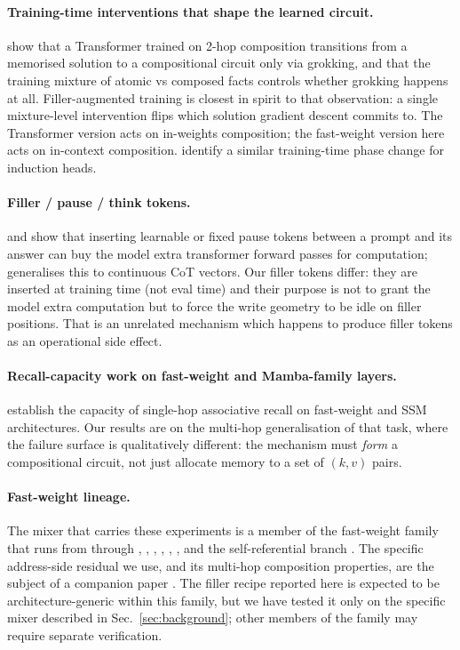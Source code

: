 \documentclass[11pt]{article}
\begin{document}
\paragraph{Training-time interventions that shape the learned
circuit.} \citet{wang2024grokked} show that a Transformer trained on
2-hop composition transitions from a memorised solution to a
compositional circuit only via grokking, and that the training
mixture of atomic vs composed facts controls whether grokking
happens at all. Filler-augmented training is closest in spirit to
that observation: a single mixture-level intervention flips which
solution gradient descent commits to. The Transformer version acts
on in-weights composition; the fast-weight version here acts on
in-context composition. \citet{olsson2022inductionheads} identify a
similar training-time phase change for induction heads.

\paragraph{Filler / pause / think tokens.} \citet{goyal2023think}
and \citet{pfau2024let} show that inserting learnable or fixed pause
tokens between a prompt and its answer can buy the model extra
transformer forward passes for computation; \citet{hao2024coconut}
generalises this to continuous CoT vectors. Our filler tokens differ:
they are inserted at training time (not eval time) and their purpose
is not to grant the model extra computation but to force the write
geometry to be idle on filler positions. That is an unrelated
mechanism which happens to produce filler tokens as an operational
side effect.

\paragraph{Recall-capacity work on fast-weight and Mamba-family
layers.} \citet{arora2023zoology,arora2024based} establish the
capacity of single-hop associative recall on fast-weight and SSM
architectures. Our results are on the multi-hop generalisation of
that task, where the failure surface is qualitatively different: the
mechanism must \emph{form} a compositional circuit, not just
allocate memory to a set of $(k,v)$ pairs.

\paragraph{Fast-weight lineage.} The mixer that carries these
experiments is a member of the fast-weight family that runs from
\citet{schmidhuber1992learning,schmidhuber1993reducing} through
\citet{schlag2021linear}, \citet{yang2024deltanet},
\citet{yang2024gated}, \citet{peng2024rwkv7}, \citet{sun2024ttt},
\citet{behrouz2025titans}, and the self-referential branch
\citep{irie2022srwm,irie2021going}. The specific address-side
residual we use, and its multi-hop composition properties, are the
subject of a companion paper \citep{fenrir2026}. The filler recipe
reported here is expected to be architecture-generic within this
family, but we have tested it only on the specific mixer described
in Sec.~\ref{sec:background}; other members of the family may
require separate verification.
\end{document}
